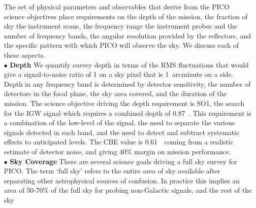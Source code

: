 \documentclass[PICOReport.tex]{subfiles}
\begin{document}
The set of physical parameters and observables that derive from the PICO science objectives place 
requirements on the depth of the mission, the fraction of sky the instrument scans, the frequency range the 
instrument probes and the number of frequency bands, the angular resolution provided by the reflectors, and
the specific pattern with which PICO will observe the sky. We discuss each of these aspects. \\
%
$\bullet$ {\bf Depth} \hspace{0.1in} We quantify survey depth in terms of the RMS fluctuations that would give
a signal-to-noise ratio of 1 on a sky pixel that is 1~arcminute on a side. Depth in any frequency band 
is determined by detector sensitivity, the number of detectors in the focal plane, the sky area covered, and the 
duration of the mission.  The science objective driving 
the depth requirement is SO1, the search for the IGW signal which 
requires a combined depth of 0.87~\microkamin. This requirement is a combination of the low-level of the signal, the need
to separate the various signals detected in each band, and the need to detect and subtract systematic effects 
to anticipated levels.  The \ac{CBE} value is 0.61~\microkamin\ coming from a realistic estimate of detector noise, and 
giving 40\% margin on mission performance. \\
%
$\bullet$ {\bf Sky Coverage} \hspace{0.1in} There are several science goals driving a full sky survey for PICO. The 
term `full sky' refers to the entire area of sky available after separating other astrophysical sources of confusion. In 
practice this implies an area of 50-70\% of the full sky for probing non-Galactic signals, and the rest of the sky
\end{document}
